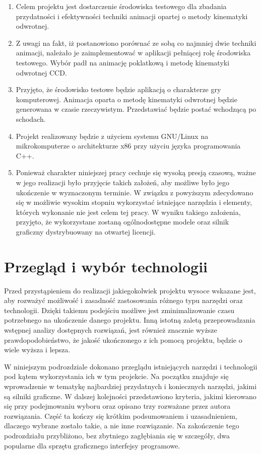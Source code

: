 \documentclass[11pt]{mwrep}
\begin{document}
\begin{enumerate}
 \item Celem projektu jest dostarczenie środowiska testowego dla zbadania przydatności i efektywności techniki animacji opartej o metody kinematyki odwrotnej.

\item Z uwagi na fakt, iż postanowiono porównać ze sobą co najmniej dwie techniki animacji, należało je zaimplementować w aplikacji pełniącej rolę środowiska testowego. Wybór padł na animację poklatkową i metodę kinematyki odwrotnej CCD.

\item Przyjęto, że środowisko testowe będzie aplikacją o charakterze gry komputerowej. Animacja oparta o metodę kinematyki odwrotnej będzie generowana w czasie rzeczywistym. Przedstawiać będzie postać wchodzącą po schodach.

\item Projekt realizowany będzie z użyciem systemu GNU/Linux na mikrokomputerze o architekturze x86 przy użyciu języka programowania C++.

\item Ponieważ charakter niniejszej pracy cechuje się wysoką presją czasową, ważne w jego realizacji było przyjęcie takich założeń, aby możliwe było jego ukończenie w wyznaczonym terminie. W związku z powyższym zdecydowano się w możliwie wysokim stopniu wykorzystać istniejące narzędzia i elementy, których wykonanie nie jest celem tej pracy. W wyniku takiego założenia, przyjęto, że wykorzystane zostaną ogólnodostępne modele oraz silnik graficzny dystrybuowany na otwartej licencji.


\end{enumerate}


  \section{Przegląd i wybór technologii}


    Przed przystąpieniem do realizacji jakiegokolwiek projektu wysoce wskazane jest, aby rozważyć możliwość i zasadność zastosowania różnego typu narzędzi oraz technologii. Dzięki takiemu podejściu możliwe jest zminimalizowanie czasu potrzebnego na ukończenie danego projektu. Inną istotną zaletą przeprowadzania wstępnej analizy dostępnych rozwiązań, jest również znacznie wyższe prawdopodobieństwo, że jakość ukończonego z ich pomocą projektu, będzie o wiele wyższa i lepsza.

    W niniejszym podrozdziale dokonano przeglądu istniejących narzędzi i technologii pod kątem wykorzystania ich w tym projekcie. Na początku znajduje się wprowadzenie w tematykę najbardziej przydatnych i koniecznych narzędzi, jakimi są silniki graficzne. W dalszej kolejności przedstawiono kryteria, jakimi kierowano się przy podejmowaniu wyboru oraz opisano trzy rozważane przez autora rozwiązania. Część ta kończy się krótkim podsumowaniem i uzasadnieniem, dlaczego wybrane zostało takie, a nie inne rozwiązanie. Na zakończenie tego podrozdziału przybliżono, bez zbytniego zagłębiania się w szczegóły, dwa popularne dla sprzętu graficznego interfejsy programowe.
\end{document}
